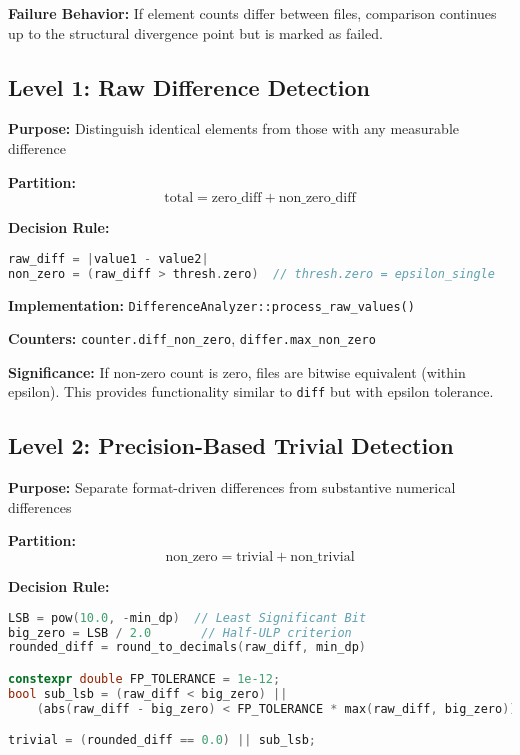 \textbf{Failure Behavior:} If element counts differ between files, comparison continues up to the structural divergence point but is marked as failed.

\subsection{Level 1: Raw Difference Detection}

\textbf{Purpose:} Distinguish identical elements from those with any measurable difference

\textbf{Partition:}
\begin{equation}
    \text{total} = \text{zero\_diff} + \text{non\_zero\_diff}
\end{equation}

\textbf{Decision Rule:}
\begin{lstlisting}[language=C++]
raw_diff = |value1 - value2|
non_zero = (raw_diff > thresh.zero)  // thresh.zero = epsilon_single
\end{lstlisting}

\textbf{Implementation:} \texttt{DifferenceAnalyzer::process\_raw\_values()}

\textbf{Counters:} \texttt{counter.diff\_non\_zero}, \texttt{differ.max\_non\_zero}

\textbf{Significance:} If non-zero count is zero, files are bitwise equivalent (within epsilon). This provides functionality similar to \texttt{diff} but with epsilon tolerance.

\subsection{Level 2: Precision-Based Trivial Detection}

\textbf{Purpose:} Separate format-driven differences from substantive numerical differences

\textbf{Partition:}
\begin{equation}
    \text{non\_zero} = \text{trivial} + \text{non\_trivial}
\end{equation}

\textbf{Decision Rule:}
\begin{lstlisting}[language=C++]
LSB = pow(10.0, -min_dp)  // Least Significant Bit
big_zero = LSB / 2.0       // Half-ULP criterion
rounded_diff = round_to_decimals(raw_diff, min_dp)

constexpr double FP_TOLERANCE = 1e-12;
bool sub_lsb = (raw_diff < big_zero) ||
    (abs(raw_diff - big_zero) < FP_TOLERANCE * max(raw_diff, big_zero));

trivial = (rounded_diff == 0.0) || sub_lsb;
\end{lstlisting}


